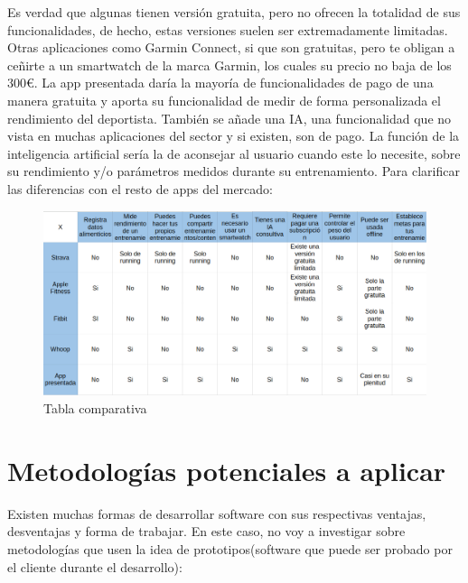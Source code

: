 Es verdad que algunas tienen versión gratuita, pero no ofrecen la totalidad de sus funcionalidades, de hecho, estas versiones suelen ser extremadamente limitadas. Otras aplicaciones como Garmin Connect, si que son gratuitas, pero te obligan a ceñirte a un smartwatch de la marca Garmin, los cuales su precio no baja de los 300€. 
La app presentada daría la mayoría de funcionalidades de pago de una manera gratuita y aporta su funcionalidad de medir de forma personalizada el rendimiento del deportista. También se añade una IA, una funcionalidad que no vista en muchas aplicaciones del sector y si existen, son de pago. La función de la inteligencia artificial sería la de aconsejar al usuario cuando este lo necesite, sobre su rendimiento y/o parámetros medidos durante su entrenamiento.
Para clarificar las diferencias con el resto de apps del mercado:

\begin{landscape}
\begin{figure}[H]
   \centering
    \includegraphics[width=1.65\textwidth]{tablas/tabla.png}
    \caption{Tabla comparativa}
    \label{fig:Tabla comparativa}
\end{figure} 
\end{landscape}

\section{Metodologías potenciales a aplicar}

Existen muchas formas de desarrollar software con sus respectivas ventajas, desventajas y forma de trabajar. En este caso, no voy a investigar sobre metodologías que usen la idea de prototipos(software que puede ser probado por el cliente durante el desarrollo):

